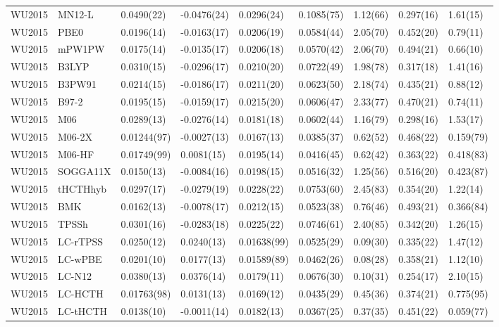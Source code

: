 \begin{table}[ht]
\begin{tabular}{lllllllll}
  WU2015 & MN12-L & 0.0490(22) & -0.0476(24) & 0.0296(24) & 0.1085(75) & 1.12(66) & 0.297(16) & 1.61(15) \\ 
  WU2015 & PBE0 & 0.0196(14) & -0.0163(17) & 0.0206(19) & 0.0584(44) & 2.05(70) & 0.452(20) & 0.79(11) \\ 
  WU2015 & mPW1PW & 0.0175(14) & -0.0135(17) & 0.0206(18) & 0.0570(42) & 2.06(70) & 0.494(21) & 0.66(10) \\ 
  WU2015 & B3LYP & 0.0310(15) & -0.0296(17) & 0.0210(20) & 0.0722(49) & 1.98(78) & 0.317(18) & 1.41(16) \\ 
  WU2015 & B3PW91 & 0.0214(15) & -0.0186(17) & 0.0211(20) & 0.0623(50) & 2.18(74) & 0.435(21) & 0.88(12) \\ 
  WU2015 & B97-2 & 0.0195(15) & -0.0159(17) & 0.0215(20) & 0.0606(47) & 2.33(77) & 0.470(21) & 0.74(11) \\ 
  WU2015 & M06 & 0.0289(13) & -0.0276(14) & 0.0181(18) & 0.0602(44) & 1.16(79) & 0.298(16) & 1.53(17) \\ 
  WU2015 & M06-2X & 0.01244(97) & -0.0027(13) & 0.0167(13) & 0.0385(37) & 0.62(52) & 0.468(22) & 0.159(79) \\ 
  WU2015 & M06-HF & 0.01749(99) & 0.0081(15) & 0.0195(14) & 0.0416(45) & 0.62(42) & 0.363(22) & 0.418(83) \\ 
  WU2015 & SOGGA11X & 0.0150(13) & -0.0084(16) & 0.0198(15) & 0.0516(32) & 1.25(56) & 0.516(20) & 0.423(87) \\ 
  WU2015 & tHCTHhyb & 0.0297(17) & -0.0279(19) & 0.0228(22) & 0.0753(60) & 2.45(83) & 0.354(20) & 1.22(14) \\ 
  WU2015 & BMK & 0.0162(13) & -0.0078(17) & 0.0212(15) & 0.0523(38) & 0.76(46) & 0.493(21) & 0.366(84) \\ 
  WU2015 & TPSSh & 0.0301(16) & -0.0283(18) & 0.0225(22) & 0.0746(61) & 2.40(85) & 0.342(20) & 1.26(15) \\ 
  WU2015 & LC-rTPSS & 0.0250(12) & 0.0240(13) & 0.01638(99) & 0.0525(29) & 0.09(30) & 0.335(22) & 1.47(12) \\ 
  WU2015 & LC-wPBE & 0.0201(10) & 0.0177(13) & 0.01589(89) & 0.0462(26) & 0.08(28) & 0.358(21) & 1.12(10) \\ 
  WU2015 & LC-N12 & 0.0380(13) & 0.0376(14) & 0.0179(11) & 0.0676(30) & 0.10(31) & 0.254(17) & 2.10(15) \\ 
  WU2015 & LC-HCTH & 0.01763(98) & 0.0131(13) & 0.0169(12) & 0.0435(29) & 0.45(36) & 0.374(21) & 0.775(95) \\ 
  WU2015 & LC-tHCTH & 0.0138(10) & -0.0011(14) & 0.0182(13) & 0.0367(25) & 0.37(35) & 0.451(22) & 0.059(77) \\ 

\end{tabular}
\end{table}
